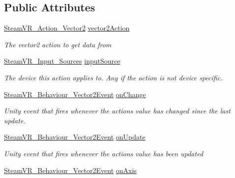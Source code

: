 \subsection*{Public Attributes}
\begin{DoxyCompactItemize}
\item 
\mbox{\hyperlink{class_valve_1_1_v_r_1_1_steam_v_r___action___vector2}{Steam\+V\+R\+\_\+\+Action\+\_\+\+Vector2}} \mbox{\hyperlink{class_valve_1_1_v_r_1_1_steam_v_r___behaviour___vector2_adae545d32e2d4d1ba57a6d36b5685df4}{vector2\+Action}}
\begin{DoxyCompactList}\small\item\em The vector2 action to get data from \end{DoxyCompactList}\item 
\mbox{\hyperlink{namespace_valve_1_1_v_r_a82e5bf501cc3aa155444ee3f0662853f}{Steam\+V\+R\+\_\+\+Input\+\_\+\+Sources}} \mbox{\hyperlink{class_valve_1_1_v_r_1_1_steam_v_r___behaviour___vector2_a00cd7447959f673d44896e7d11abcfc2}{input\+Source}}
\begin{DoxyCompactList}\small\item\em The device this action applies to. Any if the action is not device specific. \end{DoxyCompactList}\item 
\mbox{\hyperlink{class_valve_1_1_v_r_1_1_steam_v_r___behaviour___vector2_event}{Steam\+V\+R\+\_\+\+Behaviour\+\_\+\+Vector2\+Event}} \mbox{\hyperlink{class_valve_1_1_v_r_1_1_steam_v_r___behaviour___vector2_a49bf745f1c1c47440619c60913fa9132}{on\+Change}}
\begin{DoxyCompactList}\small\item\em Unity event that fires whenever the action\textquotesingle{}s value has changed since the last update. \end{DoxyCompactList}\item 
\mbox{\hyperlink{class_valve_1_1_v_r_1_1_steam_v_r___behaviour___vector2_event}{Steam\+V\+R\+\_\+\+Behaviour\+\_\+\+Vector2\+Event}} \mbox{\hyperlink{class_valve_1_1_v_r_1_1_steam_v_r___behaviour___vector2_a0b602f44337ee1c5bc3447005f4c42b3}{on\+Update}}
\begin{DoxyCompactList}\small\item\em Unity event that fires whenever the action\textquotesingle{}s value has been updated \end{DoxyCompactList}\item 
\mbox{\hyperlink{class_valve_1_1_v_r_1_1_steam_v_r___behaviour___vector2_event}{Steam\+V\+R\+\_\+\+Behaviour\+\_\+\+Vector2\+Event}} \mbox{\hyperlink{class_valve_1_1_v_r_1_1_steam_v_r___behaviour___vector2_a6fc3afc3d4382dacecb1cff67d0ea6a9}{on\+Axis}}

\end{DoxyCompactItemize}

